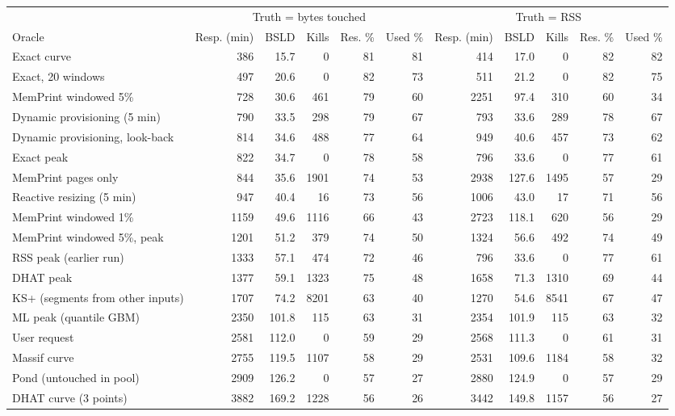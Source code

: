 \begin{tabular}{lrrrrrrrrrr}
\toprule
 & \multicolumn{5}{c}{Truth = bytes touched} & \multicolumn{5}{c}{Truth = RSS} \\
\cmidrule(lr){2-6} \cmidrule(lr){7-11}
Oracle & Resp. (min) & BSLD & Kills & Res. \% & Used \% & Resp. (min) & BSLD & Kills & Res. \% & Used \% \\
\midrule
Exact curve & 386 & 15.7 & 0 & 81 & 81 & 414 & 17.0 & 0 & 82 & 82 \\
Exact, 20 windows & 497 & 20.6 & 0 & 82 & 73 & 511 & 21.2 & 0 & 82 & 75 \\
MemPrint windowed 5\% & 728 & 30.6 & 461 & 79 & 60 & 2251 & 97.4 & 310 & 60 & 34 \\
Dynamic provisioning (5 min) & 790 & 33.5 & 298 & 79 & 67 & 793 & 33.6 & 289 & 78 & 67 \\
Dynamic provisioning, look-back & 814 & 34.6 & 488 & 77 & 64 & 949 & 40.6 & 457 & 73 & 62 \\
Exact peak & 822 & 34.7 & 0 & 78 & 58 & 796 & 33.6 & 0 & 77 & 61 \\
MemPrint pages only & 844 & 35.6 & 1901 & 74 & 53 & 2938 & 127.6 & 1495 & 57 & 29 \\
Reactive resizing (5 min) & 947 & 40.4 & 16 & 73 & 56 & 1006 & 43.0 & 17 & 71 & 56 \\
MemPrint windowed 1\% & 1159 & 49.6 & 1116 & 66 & 43 & 2723 & 118.1 & 620 & 56 & 29 \\
MemPrint windowed 5\%, peak & 1201 & 51.2 & 379 & 74 & 50 & 1324 & 56.6 & 492 & 74 & 49 \\
RSS peak (earlier run) & 1333 & 57.1 & 474 & 72 & 46 & 796 & 33.6 & 0 & 77 & 61 \\
DHAT peak & 1377 & 59.1 & 1323 & 75 & 48 & 1658 & 71.3 & 1310 & 69 & 44 \\
KS+ (segments from other inputs) & 1707 & 74.2 & 8201 & 63 & 40 & 1270 & 54.6 & 8541 & 67 & 47 \\
ML peak (quantile GBM) & 2350 & 101.8 & 115 & 63 & 31 & 2354 & 101.9 & 115 & 63 & 32 \\
User request & 2581 & 112.0 & 0 & 59 & 29 & 2568 & 111.3 & 0 & 61 & 31 \\
Massif curve & 2755 & 119.5 & 1107 & 58 & 29 & 2531 & 109.6 & 1184 & 58 & 32 \\
Pond (untouched in pool) & 2909 & 126.2 & 0 & 57 & 27 & 2880 & 124.9 & 0 & 57 & 29 \\
DHAT curve (3 points) & 3882 & 169.2 & 1228 & 56 & 26 & 3442 & 149.8 & 1157 & 56 & 27 \\

\end{tabular}
